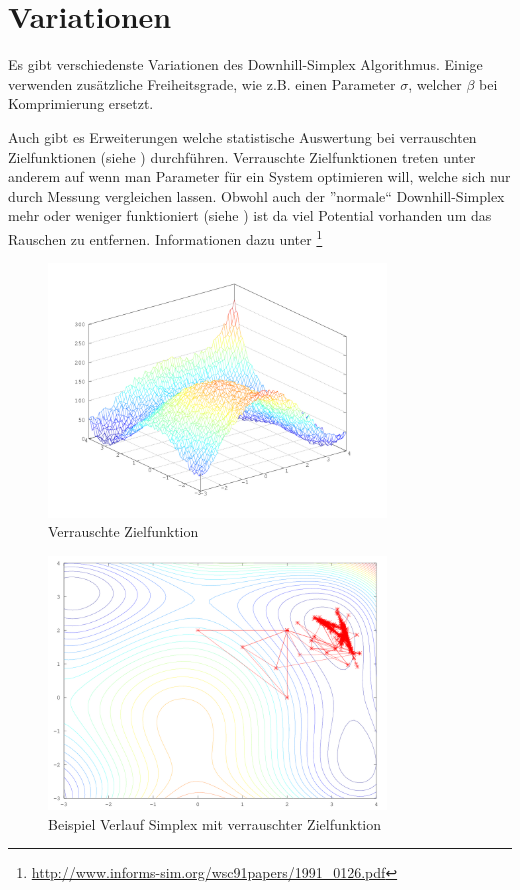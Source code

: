 \section{Variationen}
Es gibt verschiedenste Variationen des Downhill-Simplex Algorithmus.
Einige verwenden zusätzliche Freiheitsgrade, wie z.B. einen Parameter
$\sigma$, welcher $\beta$ bei Komprimierung ersetzt.

Auch gibt es Erweiterungen welche statistische Auswertung bei verrauschten Zielfunktionen (siehe ) durchführen.
Verrauschte Zielfunktionen treten unter anderem auf wenn man Parameter für ein System optimieren will, welche sich nur durch Messung vergleichen lassen.
Obwohl auch der ''normale`` Downhill-Simplex mehr oder weniger funktioniert (siehe ) ist da viel Potential vorhanden um das Rauschen zu entfernen. Informationen dazu unter \footnote{\url{http://www.informs-sim.org/wsc91papers/1991_0126.pdf}}
\begin{figure}
\centering
\includegraphics[width=0.8\textwidth]{../bilder/HimmelblauRandom/himmelblauoverview.png}
\caption{Verrauschte Zielfunktion}
\label{fig:downhillRauschen1}
\end{figure}

\begin{figure}
\centering
\includegraphics[width=0.8\textwidth]{../bilder/HimmelblauRandom/himmelblauall.png}
\caption{Beispiel Verlauf Simplex mit verrauschter Zielfunktion}
\label{fig:downhillRauschen2}
\end{figure}